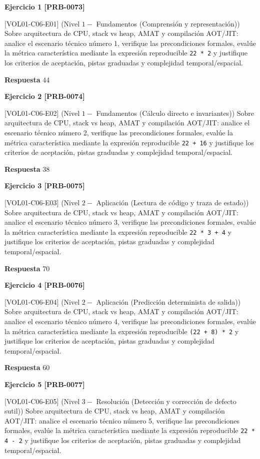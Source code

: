 \documentclass{book}
\begin{document}
\noindent\textbf{Ejercicio 1 [PRB-0073]}

[VOL01-C06-E01] (Nivel \(1 -\) Fundamentos (Comprensión y representación)) Sobre arquitectura de CPU, stack vs heap, AMAT y compilación AOT/JIT: analice el escenario técnico número 1, verifique las precondiciones formales, evalúe la métrica característica mediante la expresión reproducible \texttt{22 * 2} y justifique los criterios de aceptación, pistas graduadas y complejidad temporal/espacial.

\noindent\textbf{Respuesta} 44

\noindent\textbf{Ejercicio 2 [PRB-0074]}

[VOL01-C06-E02] (Nivel \(1 -\) Fundamentos (Cálculo directo e invariantes)) Sobre arquitectura de CPU, stack vs heap, AMAT y compilación AOT/JIT: analice el escenario técnico número 2, verifique las precondiciones formales, evalúe la métrica característica mediante la expresión reproducible \texttt{22 + 16} y justifique los criterios de aceptación, pistas graduadas y complejidad temporal/espacial.

\noindent\textbf{Respuesta} 38

\noindent\textbf{Ejercicio 3 [PRB-0075]}

[VOL01-C06-E03] (Nivel \(2 -\) Aplicación (Lectura de código y traza de estado)) Sobre arquitectura de CPU, stack vs heap, AMAT y compilación AOT/JIT: analice el escenario técnico número 3, verifique las precondiciones formales, evalúe la métrica característica mediante la expresión reproducible \texttt{22 * 3 + 4} y justifique los criterios de aceptación, pistas graduadas y complejidad temporal/espacial.

\noindent\textbf{Respuesta} 70

\noindent\textbf{Ejercicio 4 [PRB-0076]}

[VOL01-C06-E04] (Nivel \(2 -\) Aplicación (Predicción determinista de salida)) Sobre arquitectura de CPU, stack vs heap, AMAT y compilación AOT/JIT: analice el escenario técnico número 4, verifique las precondiciones formales, evalúe la métrica característica mediante la expresión reproducible \texttt{(22 + 8) * 2} y justifique los criterios de aceptación, pistas graduadas y complejidad temporal/espacial.

\noindent\textbf{Respuesta} 60

\noindent\textbf{Ejercicio 5 [PRB-0077]}

[VOL01-C06-E05] (Nivel \(3 -\) Resolución (Detección y corrección de defecto sutil)) Sobre arquitectura de CPU, stack vs heap, AMAT y compilación AOT/JIT: analice el escenario técnico número 5, verifique las precondiciones formales, evalúe la métrica característica mediante la expresión reproducible \texttt{22 * 4 - 2} y justifique los criterios de aceptación, pistas graduadas y complejidad temporal/espacial.
\end{document}
